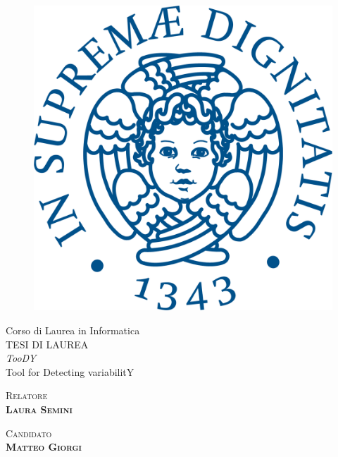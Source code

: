 \documentclass[12pt]{report}
\newcommand{\toody}{\textsl{TooDY}\xspace}
\begin{document}
\fontsize{13}{18}\selectfont


\begin{titlepage}
\begin{figure}
    \centering\includegraphics[scale=0.5]{cherubino.png}
\end{figure}
\begin{center}
    {\LARGE{Corso di Laurea in Informatica}}\\
    \vspace{1cm}
    {\Large {TESI DI LAUREA}}\\
    \vspace{3cm}
    {\huge {\toody\\{\normalsize Tool for Detecting variabilitY}}}
\end{center}
\vspace{2cm}
\begin{minipage}[t]{0.49\textwidth}\centering
	{\large{\scshape{Relatore}\\\bf{Laura Semini}}}
\end{minipage}
\hfill
\begin{minipage}[t]{0.49\textwidth}\centering
	{\large{\scshape{Candidato}\\\bf{Matteo Giorgi}}}
\vspace{4cm}
\end{minipage}
\end{titlepage}
\end{document}
